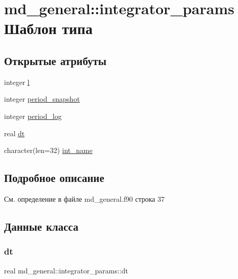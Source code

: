 \hypertarget{structmd__general_1_1integrator__params}{}\section{md\+\_\+general\+:\+:integrator\+\_\+params Шаблон типа}
\label{structmd__general_1_1integrator__params}
\subsection*{Открытые атрибуты}
\begin{DoxyCompactItemize}
\item 
integer \mbox{\hyperlink{structmd__general_1_1integrator__params_a429731dee807f3669a8cd4f8d1c03669}{l}}
\item 
integer \mbox{\hyperlink{structmd__general_1_1integrator__params_a9ccbea50d63a4ed071c21f441e12ebbf}{period\+\_\+snapshot}}
\item 
integer \mbox{\hyperlink{structmd__general_1_1integrator__params_a80455167f3d94737a72d349c78516dcb}{period\+\_\+log}}
\item 
real \mbox{\hyperlink{structmd__general_1_1integrator__params_a421afffa09e4c728d4a2954d9fe59a49}{dt}}
\item 
character(len=32) \mbox{\hyperlink{structmd__general_1_1integrator__params_a39acd9f053ea08a505f545789367a90c}{int\+\_\+name}}
\end{DoxyCompactItemize}


\subsection{Подробное описание}


См. определение в файле md\+\_\+general.\+f90 строка 37



\subsection{Данные класса}
\mbox{\label{structmd__general_1_1integrator__params_a421afffa09e4c728d4a2954d9fe59a49}} 
\subsubsection{\texorpdfstring{dt}{dt}}
{\footnotesize\ttfamily real md\+\_\+general\+::integrator\+\_\+params\+::dt}



